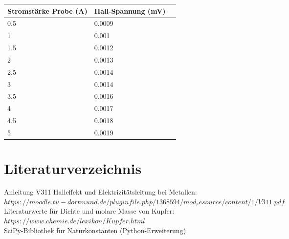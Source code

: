 \documentclass[titlepage=firstcover, captions=tableheading]{scrartcl}
\begin{document}
\begin{center}
    \begin{tabular}{lll}
        \toprule
        Stromstärke Probe (A) & Hall-Spannung (mV) \\
        \midrule 
          0.5      & 0.0009 \\
          1        & 0.001 \\
          1.5      & 0.0012 \\ 
          2        & 0.0013 \\ 
          2.5      & 0.0014\\  
          3        & 0.0014 \\ 
          3.5      & 0.0016 \\ 
          4        & 0.0017 \\ 
          4.5      & 0.0018 \\ 
          5        & 0.0019 \\ 
        \bottomrule
    \end{tabular}
\end{center}

\section{Literaturverzeichnis}
Anleitung V311 Halleffekt und Elektrizitätsleitung bei Metallen: $https://moodle.tu-dortmund.de/pluginfile.php/1368594/mod_resource/content/1/V311.pdf$\\
Literaturwerte für Dichte und molare Masse von Kupfer: $https://www.chemie.de/lexikon/Kupfer.html$\\
SciPy-Bibliothek für Naturkonstanten (Python-Erweiterung)
\end{document}
